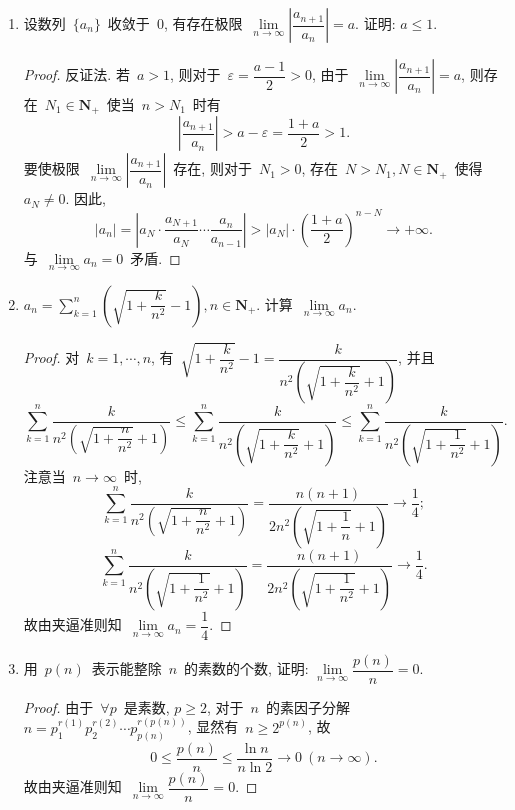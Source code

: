 \documentclass[UTF8,a4paper,10pt,twoside]{book}
\begin{document}
\begin{enumerate}
	\item 设数列~$\{a_n\}$~收敛于~$0$, 有存在极限~$\lim\limits_{n\to\infty} \left|\dfrac{a_{n+1}}{a_n}\right|=a$. 证明: $a\leqslant 1$.
	      \begin{proof}
		      反证法. 若~$a>1$, 则对于~$\varepsilon=\dfrac{a-1}{2}>0$, 由于~$\lim\limits_{n\to\infty} \left|\dfrac{a_{n+1}}{a_n}\right|=a$, 则存在~$N_1\in\mathbf{N}_{+}$~使当~$n>N_1$~时有
		      \[
			      \left|\dfrac{a_{n+1}}{a_n}\right|>a-\varepsilon=\dfrac{1+a}{2}>1.
		      \]
		      要使极限~$\lim\limits_{n\to\infty} \left|\dfrac{a_{n+1}}{a_n}\right|$~存在, 则对于~$N_1>0$, 存在~$N>N_1, N\in\mathbf{N}_{+}$~使得~$a_{N}\neq 0$. 因此,
		      \[
			      |a_n|=\left|a_N\cdot\dfrac{a_{N+1}}{a_{N}}\cdots\dfrac{a_n}{a_{n-1}}\right|>|a_N|\cdot\left(\dfrac{1+a}{2}\right)^{n-N}\to+\infty.
		      \]
		      与~$\lim\limits_{n\to\infty} a_n=0$~矛盾. \qedhere
	      \end{proof}

	\item $a_n=\displaystyle\sum\limits_{k=1}^n\left(\sqrt{1+\dfrac{k}{n^2}}-1\right), n\in\mathbf{N}_{+}$. 计算~$\lim\limits_{n\to\infty} a_n$.
	      \begin{proof}
		      对~$k=1,\cdots, n$, 有~$\sqrt{1+\dfrac{k}{n^2}}-1=\dfrac{k}{n^2\left(\sqrt{1+\dfrac{k}{n^2}}+1\right)}$, 并且
		      \[
			      \sum_{k=1}^{n} \dfrac{k}{n^2\left(\sqrt{1+\dfrac{n}{n^2}}+1\right)}\leqslant \sum_{k=1}^{n} \dfrac{k}{n^2\left(\sqrt{1+\dfrac{k}{n^2}}+1\right)}\leqslant \sum_{k=1}^{n} \dfrac{k}{n^2\left(\sqrt{1+\dfrac{1}{n^2}}+1\right)}.
		      \]
		      注意当~$n\to\infty$~时,
		      \[
			      \sum_{k=1}^{n} \dfrac{k}{n^2\left(\sqrt{1+\dfrac{n}{n^2}}+1\right)}=\dfrac{n(n+1)}{2n^2\left(\sqrt{1+\dfrac{1}{n}}+1\right)}\to\dfrac{1}{4};
		      \]
		      \[
			      \sum_{k=1}^{n} \dfrac{k}{n^2\left(\sqrt{1+\dfrac{1}{n^2}}+1\right)}=\dfrac{n(n+1)}{2n^2\left(\sqrt{1+\dfrac{1}{n^2}}+1\right)}\to\dfrac{1}{4}.
		      \]
		      故由夹逼准则知~$\lim\limits_{n\to\infty} a_n=\dfrac{1}{4}$. \qedhere
	      \end{proof}

	\item 用~$p(n)$~表示能整除~$n$~的素数的个数, 证明: $\lim\limits_{n\to\infty} \dfrac{p(n)}{n}=0$.
	      \begin{proof}
		      由于~$\forall p$~是素数, $p\geqslant 2$, 对于~$n$~的素因子分解~$n=p_1^{r(1)}p_2^{r(2)}\cdots p_{p(n)}^{r(p(n))}$, 显然有~$n\geqslant 2^{p(n)}$, 故
		      \[
			      0\leqslant\dfrac{p(n)}{n}\leqslant\dfrac{\ln{n}}{n\ln{2}}\to 0\ (n\to\infty).
		      \]
		      故由夹逼准则知~$\lim\limits_{n\to\infty} \dfrac{p(n)}{n}=0$.\qedhere
	      \end{proof}


\end{enumerate}
\end{document}
